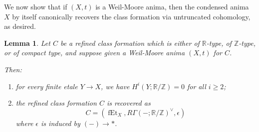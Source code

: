 \documentclass[12pt]{article}
\newtheorem{lemma}[theorem]{Lemma}
\theoremstyle{definition}
\newcommand{\on}{\operatorname}
\newcommand{\mbb}{\mathbb}
\begin{document}
We now show that if $(X,t)$ is a Weil-Moore anima, then the condensed anima $X$ by itself canonically recovers the class formation via untruncated cohomology, as desired.

\begin{lemma}\label{mooreisweilmoore}
Let $C$ be a refined class formation which is either of $\mbb{R}$-type, of $\mbb{Z}$-type, or of compact type, and suppose given a Weil-Moore anima $(X,t)$ for $C$.

Then:
\begin{enumerate}
\item for every finite etale $Y\to X$, we have $H^i(Y;\mbb{R}/\mbb{Z})=0$ for all $i\geq 2$;
\item the refined class formation $C$ is recovered as
$$C=(\on{fEt}_X,R\Gamma(-;\mbb{R}/\mbb{Z})^\vee,\epsilon)$$
where $\epsilon$ is induced by $(-)\to \ast$.
\end{enumerate}
\end{lemma}
\end{document}

